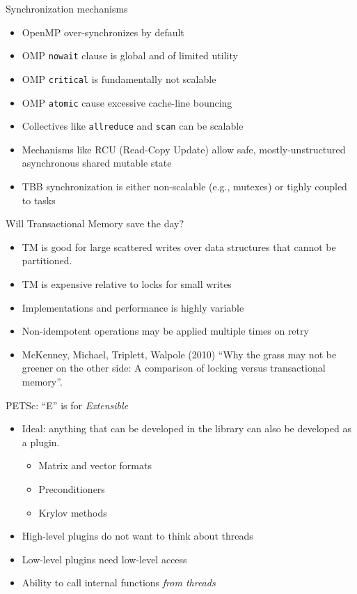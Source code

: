 \documentclass{beamer}
\begin{document}
\begin{frame}{Synchronization mechanisms}
  \begin{itemize}
  \item OpenMP over-synchronizes by default
  \item OMP \texttt{nowait} clause is global and of limited utility
  \item OMP \texttt{critical} is fundamentally not scalable
  \item OMP \texttt{atomic} cause excessive cache-line bouncing
  \item Collectives like \texttt{allreduce} and \texttt{scan} can be scalable
  \item Mechanisms like RCU (Read-Copy Update) allow safe, mostly-unstructured asynchronous shared mutable state
  \item TBB synchronization is either non-scalable (e.g., mutexes) or tighly coupled to tasks
  \end{itemize}
\end{frame}

\begin{frame}{Will Transactional Memory save the day?}
  \begin{itemize}
  \item TM is good for large scattered writes over data structures that cannot be partitioned.
  \item TM is expensive relative to locks for small writes
  \item Implementations and performance is highly variable
  \item Non-idempotent operations may be applied multiple times on retry
  \item McKenney, Michael, Triplett, Walpole (2010) ``Why the grass may not be greener on the other side: A comparison of locking versus transactional memory''.
  \end{itemize}
\end{frame}

\begin{frame}{PETSc: ``E'' is for \emph{Extensible}}
  \begin{itemize}
  \item Ideal: anything that can be developed in the library can also be developed as a plugin.
    \begin{itemize}
    \item Matrix and vector formats
    \item Preconditioners
    \item Krylov methods
    \end{itemize}
  \item High-level plugins do not want to think about threads
  \item Low-level plugins need low-level access
  \item Ability to call internal functions \emph{from threads}
  \end{itemize}
\end{frame}
\end{document}
